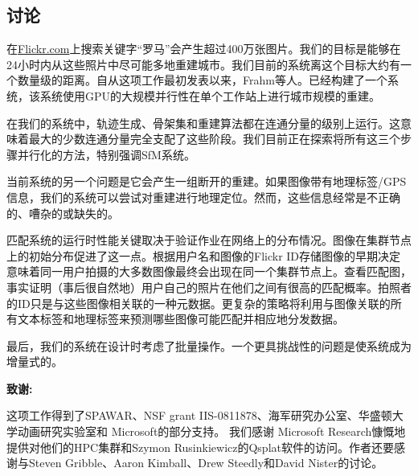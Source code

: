 \begin{translation}
\section{讨论}
在\href{Flickr.com}{Flickr.com}上搜索关键字“罗马”会产生超过400万张图片。我们的目标是能够在24小时内从这些照片中尽可能多地重建城市。我们目前的系统离这个目标大约有一个数量级的距离。自从这项工作最初发表以来，Frahm等人。已经构建了一个系统，该系统使用GPU的大规模并行性在单个工作站上进行城市规模的重建\cite{frahm2010building}。

在我们的系统中，轨迹生成、骨架集和重建算法都在连通分量的级别上运行。这意味着最大的少数连通分量完全支配了这些阶段。我们目前正在探索将所有这三个步骤并行化的方法，特别强调SfM系统。

当前系统的另一个问题是它会产生一组断开的重建。如果图像带有地理标签/GPS信息，我们的系统可以尝试对重建进行地理定位。然而，这些信息经常是不正确的、嘈杂的或缺失的。

匹配系统的运行时性能关键取决于验证作业在网络上的分布情况。图像在集群节点上的初始分布促进了这一点。根据用户名和图像的Flickr ID存储图像的早期决定意味着同一用户拍摄的大多数图像最终会出现在同一个集群节点上。查看匹配图，事实证明（事后很自然地）用户自己的照片在他们之间有很高的匹配概率。拍照者的ID只是与这些图像相关联的一种元数据。更复杂的策略将利用与图像关联的所有文本标签和地理标签来预测哪些图像可能匹配并相应地分发数据。

最后，我们的系统在设计时考虑了批量操作。一个更具挑战性的问题是使系统成为增量式的。

\textbf{致谢:}

这项工作得到了SPAWAR、NSF grant IIS-0811878、海军研究办公室、华盛顿大学动画研究实验室和 Microsoft的部分支持。 我们感谢 Microsoft Research慷慨地提供对他们的HPC集群和Szymon Rusinkiewicz的Qsplat软件的访问。作者还要感谢与Steven Gribble、Aaron Kimball、Drew Steedly和David Nister的讨论。

	



\begin{translation-index}
	\nocite{agarwal2011building}
	
	
\end{translation-index}

\end{translation}